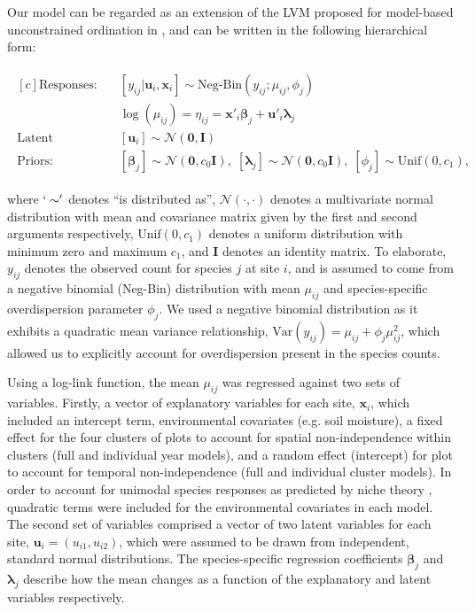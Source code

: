 Our model can be regarded as an extension of the LVM proposed for model-based unconstrained ordination in \citet{Hui2014}, and can be written in the following hierarchical form:

\begin{align} \begin{aligned}[c] \label{eqn:basiclvm} 
\text{Responses:} &\quad [y_{ij} | \bm{u}_i, \bm{x}_i] \sim \text{Neg-Bin}(y_{ij}; \mu_{ij}, \phi_j) \\
&\quad \log(\mu_{ij}) = \eta_{ij} = \bm{x}'_i \bm{\beta}_j + \bm{u}'_i \bm{\lambda}_j \\
\text{Latent Variables:} &\quad [\bm{u}_{i}] \sim \mathcal{N}(\bm{0},\bm{I}) \\ 
\text{Priors:} &\quad [\bm{\beta}_j] \sim \mathcal{N}(\bm{0},c_0\bm{I}), \; [\bm{\lambda}_j] \sim \mathcal{N}(\bm{0},c_0\bm{I}), \; [\phi_j] \sim \text{Unif}(0,c_1), 
\end{aligned} \end{align}

where $`\sim'$ denotes ``is distributed as'', $\mathcal{N}(\cdot,\cdot)$ denotes a multivariate normal distribution with mean and covariance matrix given by the first and second arguments respectively, $\text{Unif}(0,c_1)$ denotes a uniform distribution with minimum zero and maximum $c_1$, and $\bm{I}$ denotes an identity matrix. To elaborate, $y_{ij}$ denotes the observed count for species $j$ at site $i$, and is assumed to come from a negative binomial (Neg-Bin) distribution with mean $\mu_{ij}$ and species-specific overdispersion parameter $\phi_j$. We used a negative binomial distribution as it exhibits a quadratic mean variance relationship, $\text{Var}(y_{ij}) = \mu_{ij} + \phi_j\mu^2_{ij}$, which allowed us to explicitly account for overdispersion present in the species counts.

Using a log-link function, the mean $\mu_{ij}$ was regressed against two sets of variables. Firstly, a vector of explanatory variables for each site, $\bm{x}_i$, which included an intercept term, environmental covariates (e.g. soil moisture), a fixed effect for the four clusters of plots to account for spatial non-independence within clusters (full and individual year models), and a random effect (intercept) for plot to account for temporal non-independence (full and individual cluster models). In order to account for unimodal species responses as predicted by niche theory \citep{Austin2002}, quadratic terms were included for the environmental covariates in each model. The second set of variables comprised a vector of two latent variables for each site, $\bm{u}_i = (u_{i1},u_{i2})$, which were assumed to be drawn from independent, standard normal distributions. The species-specific regression coefficients $\bm{\beta}_j$ and $\bm{\lambda}_j$ describe how the mean changes as a function of the explanatory and latent variables respectively.  

